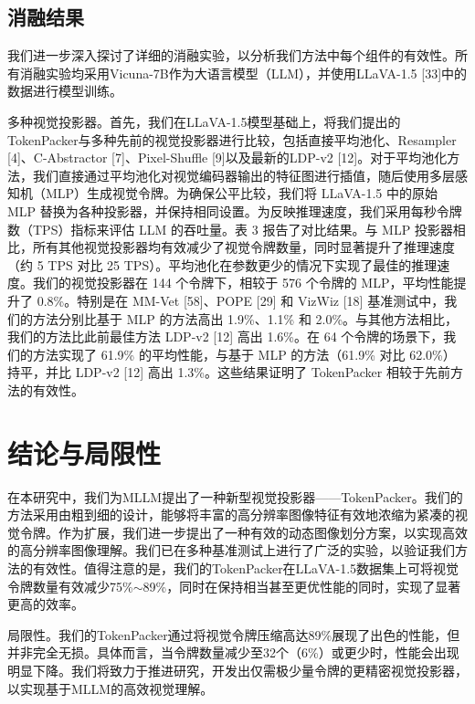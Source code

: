 \subsection{消融结果}

我们进一步深入探讨了详细的消融实验，以分析我们方法中每个组件的有效性。所有消融实验均采用Vicuna-7B作为大语言模型（LLM），并使用LLaVA-1.5 [33]中的数据进行模型训练。

多种视觉投影器。首先，我们在LLaVA-1.5模型基础上，将我们提出的TokenPacker与多种先前的视觉投影器进行比较，包括直接平均池化、Resampler [4]、C-Abstractor [7]、Pixel-Shuffle [9]以及最新的LDP-v2 [12]。对于平均池化方法，我们直接通过平均池化对视觉编码器输出的特征图进行插值，随后使用多层感知机（MLP）生成视觉令牌。为确保公平比较，我们将 LLaVA-1.5 中的原始 MLP 替换为各种投影器，并保持相同设置。为反映推理速度，我们采用每秒令牌数（TPS）指标来评估 LLM 的吞吐量。表 3 报告了对比结果。与 MLP 投影器相比，所有其他视觉投影器均有效减少了视觉令牌数量，同时显著提升了推理速度（约 5 TPS 对比 25 TPS）。平均池化在参数更少的情况下实现了最佳的推理速度。我们的视觉投影器在 144 个令牌下，相较于 576 个令牌的 MLP，平均性能提升了 0.8\%。特别是在 MM-Vet [58]、POPE [29] 和 VizWiz [18] 基准测试中，我们的方法分别比基于 MLP 的方法高出 1.9\%、1.1\% 和 2.0\%。与其他方法相比，我们的方法比此前最佳方法 LDP-v2 [12] 高出 1.6\%。在 64 个令牌的场景下，我们的方法实现了 61.9\% 的平均性能，与基于 MLP 的方法（61.9\% 对比 62.0\%）持平，并比 LDP-v2 [12] 高出 1.3\%。这些结果证明了 TokenPacker 相较于先前方法的有效性。

\section{结论与局限性}

在本研究中，我们为MLLM提出了一种新型视觉投影器——TokenPacker。我们的方法采用由粗到细的设计，能够将丰富的高分辨率图像特征有效地浓缩为紧凑的视觉令牌。作为扩展，我们进一步提出了一种有效的动态图像划分方案，以实现高效的高分辨率图像理解。我们已在多种基准测试上进行了广泛的实验，以验证我们方法的有效性。值得注意的是，我们的TokenPacker在LLaVA-1.5数据集上可将视觉令牌数量有效减少75\%$\sim$89\%，同时在保持相当甚至更优性能的同时，实现了显著更高的效率。

局限性。我们的TokenPacker通过将视觉令牌压缩高达89\%展现了出色的性能，但并非完全无损。具体而言，当令牌数量减少至32个（6\%）或更少时，性能会出现明显下降。我们将致力于推进研究，开发出仅需极少量令牌的更精密视觉投影器，以实现基于MLLM的高效视觉理解。
